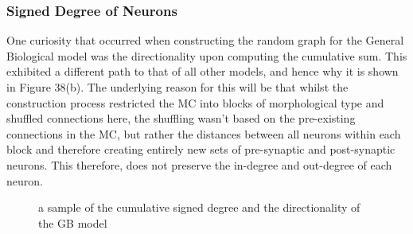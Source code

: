 \subsubsection{Signed Degree of Neurons}
One curiosity that occurred when constructing the random graph for the General Biological model was the directionality upon computing the cumulative sum. This exhibited a different path to that of all other models, and hence why it is shown in Figure 38(b). The underlying reason for this will be that whilst the construction process restricted the MC into blocks of morphological type and shuffled connections here, the shuffling wasn't based on the pre-existing connections in the MC, but rather the distances between all neurons within each block and therefore creating entirely new sets of pre-synaptic and post-synaptic neurons. This therefore, does not preserve the in-degree and out-degree of each neuron.
\begin{figure}[H]%
    \centering
    \captionsetup{justification=centering}
    \qquad
    \caption{a sample of the cumulative signed degree and the directionality of the GB model}%
    \label{fig:example}%
\end{figure}
